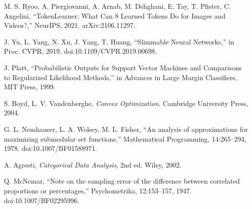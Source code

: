 \begin{thebibliography}{99}
M. S. Ryoo, A. Piergiovanni, A. Arnab, M. Dehghani, E. Tay, T. Pfister, C. Angelini, ``TokenLearner: What Can 8 Learned Tokens Do for Images and Videos?,'' NeurIPS, 2021. arXiv:2106.11297.

J. Yu, L. Yang, N. Xu, J. Yang, T. Huang, ``Slimmable Neural Networks,'' in Proc. CVPR, 2019. doi:10.1109/CVPR.2019.00698.

J. Platt, ``Probabilistic Outputs for Support Vector Machines and Comparisons to Regularized Likelihood Methods,'' in Advances in Large Margin Classifiers, MIT Press, 1999.

S. Boyd, L. V. Vandenberghe, \emph{Convex Optimization}. Cambridge University Press, 2004.

G. L. Nemhauser, L. A. Wolsey, M. L. Fisher, ``An analysis of approximations for maximizing submodular set functions,'' Mathematical Programming, 14:265--294, 1978. doi:10.1007/BF01588971.

A. Agresti, \emph{Categorical Data Analysis}, 2nd ed. Wiley, 2002.

Q. McNemar, ``Note on the sampling error of the difference between correlated proportions or percentages,'' Psychometrika, 12:153--157, 1947. doi:10.1007/BF02295996.

\end{thebibliography}

